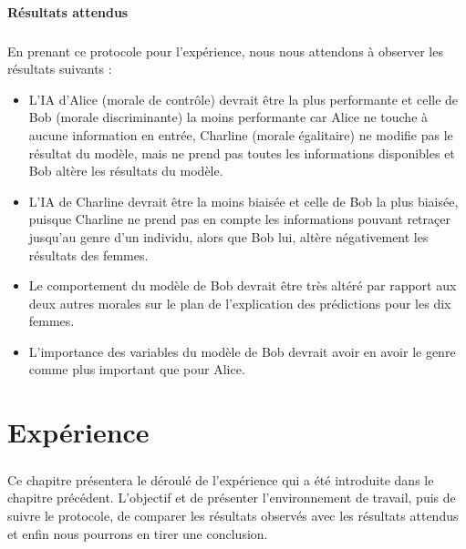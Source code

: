\documentclass[10pt, french, a4paper]{report}
\begin{document}

\subsubsection{Résultats attendus} 

\paragraph{}
En prenant ce protocole pour l'expérience, nous nous attendons à observer les résultats suivants :

\begin{itemize}
  \item L'IA d'Alice (morale de contrôle) devrait être la plus performante et celle de Bob (morale discriminante) la moins performante car Alice ne touche à aucune information en entrée, Charline (morale égalitaire) ne modifie pas le résultat du modèle, mais ne prend pas toutes les informations disponibles et Bob altère les résultats du modèle.
  \item L'IA de Charline devrait être la moins biaisée et celle de Bob la plus biaisée, puisque Charline ne prend pas en compte les informations pouvant retraçer jusqu'au genre d'un individu, alors que Bob lui, altère négativement les résultats des femmes.
  \item Le comportement du modèle de Bob devrait être très altéré par rapport aux deux autres morales sur le plan de l'explication des prédictions pour les dix femmes.
  \item L'importance des variables du modèle de Bob devrait avoir en avoir le genre comme plus important que pour Alice.
\end{itemize}


\newpage
\chapter{Expérience}

\paragraph{}
Ce chapitre présentera le déroulé de l'expérience qui a été introduite dans le chapitre précédent. L'objectif et de présenter l'environnement de travail, puis de suivre le protocole, de comparer les résultats observés avec les résultats attendus et enfin nous pourrons en tirer une conclusion.
\end{document}
